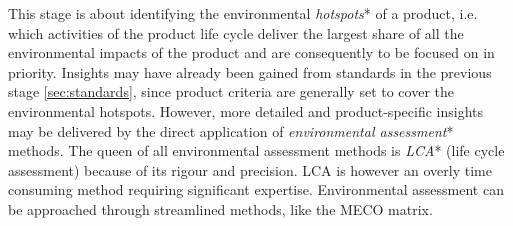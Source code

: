 \documentclass{article}
\begin{document}
This stage is about identifying the environmental \emph{hotspots}* of a product, i.e. which activities of the product life cycle deliver the largest share of all the environmental impacts of the product and are consequently to be focused on in priority. Insights may have already been gained from standards in the previous stage \ref{sec:standards}, since product criteria are generally set to cover the environmental hotspots. However, more detailed and product-specific insights may be delivered by the direct application of \emph{environmental assessment}* methods. The queen of all environmental assessment methods is \emph{LCA}* (life cycle assessment) because of its rigour and precision. LCA is however an overly time consuming method requiring significant expertise. Environmental assessment can be approached through streamlined methods, like the MECO matrix. 
\end{document}
